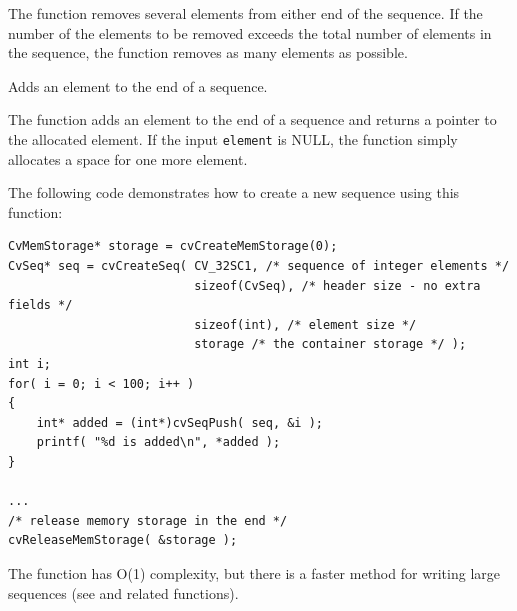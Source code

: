 \begin{description}
\end{description}

The function removes several elements from either end of the sequence. If the number of the elements to be removed exceeds the total number of elements in the sequence, the function removes as many elements as possible.

Adds an element to the end of a sequence.


\begin{description}
\end{description}

The function adds an element to the end of a sequence and returns a pointer to the allocated element. If the input \texttt{element} is NULL, the function simply allocates a space for one more element.

The following code demonstrates how to create a new sequence using this function:

\begin{lstlisting}
CvMemStorage* storage = cvCreateMemStorage(0);
CvSeq* seq = cvCreateSeq( CV_32SC1, /* sequence of integer elements */
                          sizeof(CvSeq), /* header size - no extra fields */
                          sizeof(int), /* element size */
                          storage /* the container storage */ );
int i;
for( i = 0; i < 100; i++ )
{
    int* added = (int*)cvSeqPush( seq, &i );
    printf( "%d is added\n", *added );
}

...
/* release memory storage in the end */
cvReleaseMemStorage( &storage );
\end{lstlisting}

The function has O(1) complexity, but there is a faster method for writing large sequences (see  and related functions).


